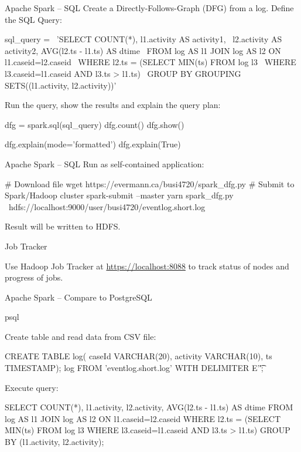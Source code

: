 \documentclass[ignorenonframetext,xcolor=x11names]{beamer}
\begin{document}
\begin{frame}[fragile]{Apache Spark -- SQL}
Create a Directly-Follows-Graph (DFG) from a log. Define the SQL Query:
\begin{pythoncode}
sql_query = \
'SELECT COUNT(*), l1.activity AS activity1, \
 l2.activity AS activity2, AVG(l2.ts - l1.ts) AS dtime \
  FROM log AS l1 JOIN log AS l2 ON l1.caseid=l2.caseid \
   WHERE l2.ts = (SELECT MIN(ts) FROM log l3 \
    WHERE l3.caseid=l1.caseid AND l3.ts > l1.ts) \
     GROUP BY GROUPING SETS((l1.activity, l2.activity))'
\end{pythoncode}
Run the query, show the results and explain the query plan:
\begin{pythoncode}
dfg = spark.sql(sql_query)
dfg.count()
dfg.show()

dfg.explain(mode='formatted')
dfg.explain(True)
\end{pythoncode}
\end{frame}

\begin{frame}[fragile]{Apache Spark -- SQL}
Run as self-contained application:
\begin{bashcode}
# Download file
wget https://evermann.ca/busi4720/spark_dfg.py
# Submit to Spark/Hadoop cluster
spark-submit --master yarn spark_dfg.py \
 hdfs://localhost:9000/user/busi4720/eventlog.short.log
\end{bashcode}
Result will be written to HDFS. \\

\begin{block}{Job Tracker}
\begin{center}
Use Hadoop Job Tracker at \url{https://localhost:8088} to track status of nodes and progress of jobs.
\end{center}
\end{block}
\end{frame}

\begin{frame}[fragile]{Apache Spark -- Compare to PostgreSQL}
\begin{bashcode}
psql
\end{bashcode}
Create table and read data from CSV file:
\begin{sqlcode}
CREATE TABLE log(
  caseId VARCHAR(20), 
  activity VARCHAR(10), 
  ts TIMESTAMP);
\COPY log FROM 'eventlog.short.log' 
  WITH DELIMITER E'\t';
\end{sqlcode}
Execute query:
\begin{sqlcode}
SELECT COUNT(*), l1.activity, l2.activity, 
 AVG(l2.ts - l1.ts) AS dtime 
  FROM log AS l1 JOIN log AS l2 ON l1.caseid=l2.caseid 
   WHERE l2.ts = (SELECT MIN(ts) FROM log l3 
    WHERE l3.caseid=l1.caseid AND l3.ts > l1.ts) 
     GROUP BY (l1.activity, l2.activity);
\end{sqlcode}
\end{frame}
\end{document}
